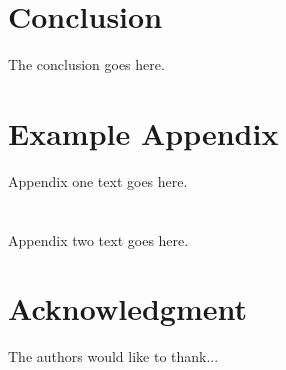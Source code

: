\documentclass[journal]{IEEEtran}
\begin{document}
\section{Conclusion}
The conclusion goes here.






%


\appendices
\section{Example Appendix}
Appendix one text goes here.

\section{}
Appendix two text goes here.


\section*{Acknowledgment}


The authors would like to thank...


\ifCLASSOPTIONcaptionsoff
  \newpage
\fi
\end{document}
